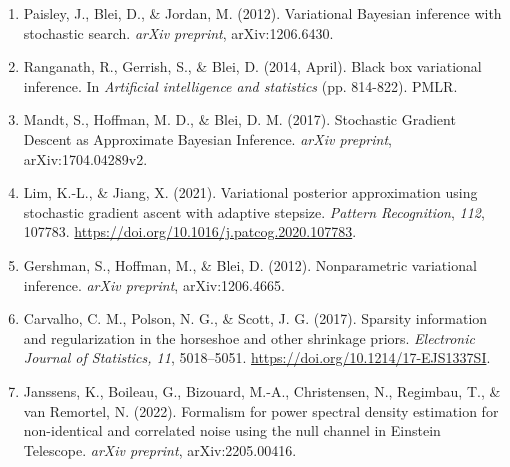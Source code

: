 \documentclass[12pt,a4paper]{article}
\begin{document}
\begin{enumerate}
\item \label{paisley2012} Paisley, J., Blei, D., \& Jordan, M. (2012). Variational Bayesian inference with stochastic search. \textit{arXiv preprint}, arXiv:1206.6430.

\item \label{ranganath2014} Ranganath, R., Gerrish, S., \& Blei, D. (2014, April). Black box variational inference. In \textit{Artificial intelligence and statistics} (pp. 814-822). PMLR.

\item \label{mandt2017} Mandt, S., Hoffman, M. D., \& Blei, D. M. (2017). Stochastic Gradient Descent as Approximate Bayesian Inference. \textit{arXiv preprint}, arXiv:1704.04289v2.

\item \label{lim2021} Lim, K.-L., \& Jiang, X. (2021). Variational posterior approximation using stochastic gradient ascent with adaptive stepsize. \textit{Pattern Recognition}, \textit{112}, 107783. \url{https://doi.org/10.1016/j.patcog.2020.107783}.

\item \label{gershman2012} Gershman, S., Hoffman, M., \& Blei, D. (2012). Nonparametric variational inference. \textit{arXiv preprint}, arXiv:1206.4665.

\item \label{pii2017} Carvalho, C. M., Polson, N. G., \& Scott, J. G. (2017). Sparsity information and regularization in the horseshoe and other shrinkage priors. \textit{Electronic Journal of Statistics, 11}, 5018–5051. \url{https://doi.org/10.1214/17-EJS1337SI}.

\item \label{janssens2022} Janssens, K., Boileau, G., Bizouard, M.-A., Christensen, N., Regimbau, T., \& van Remortel, N. (2022). Formalism for power spectral density estimation for non-identical and correlated noise using the null channel in Einstein Telescope. \textit{arXiv preprint}, arXiv:2205.00416.

\end{enumerate}
\end{document}
